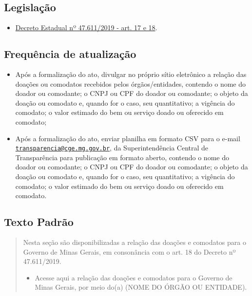 \documentclass[]{book}
\providecommand{\tightlist}{%
  \setlength{\itemsep}{0pt}\setlength{\parskip}{0pt}}
\begin{document}
\hypertarget{legislauxe7uxe3o-12}{%
\subsection{Legislação}\label{legislauxe7uxe3o-12}}

\begin{itemize}
\tightlist
\item
  \href{https://www.almg.gov.br/consulte/legislacao/completa/completa.html?tipo=DEC\&num=47611\&comp=\&ano=2019}{Decreto Estadual nº 47.611/2019 - art. 17 e 18}.
\end{itemize}

\hypertarget{frequuxeancia-de-atualizauxe7uxe3o-11}{%
\subsection{Frequência de atualização}\label{frequuxeancia-de-atualizauxe7uxe3o-11}}

\begin{itemize}
\tightlist
\item
  Após a formalização do ato, divulgar no próprio sítio eletrônico a relação das doações ou comodatos recebidos pelos órgãos/entidades, contendo o nome do doador ou comodante; o CNPJ ou CPF do doador ou comodante; o objeto da doação ou comodato e, quando for o caso, seu quantitativo; a vigência do comodato; o valor estimado do bem ou serviço doado ou oferecido em comodato;
\item
  Após a formalização do ato, enviar planilha em formato CSV para o e-mail \href{mailto:transparencia@cge.mg.gov.br}{\nolinkurl{transparencia@cge.mg.gov.br}}, da Superintendência Central de Transparência para publicação em formato aberto, contendo o nome do doador ou comodante; o CNPJ ou CPF do doador ou comodante; o objeto da doação ou comodato e, quando for o caso, seu quantitativo; a vigência do comodato; o valor estimado do bem ou serviço doado ou oferecido em comodato.
\end{itemize}

\hypertarget{texto-padruxe3o-12}{%
\subsection{Texto Padrão}\label{texto-padruxe3o-12}}

\begin{quote}
Nesta seção são disponibilizadas a relação das doações e comodatos para o Governo de Minas Gerais, em consonância com o art. 18 do Decreto nº 47.611/2019.

\begin{itemize}
\tightlist
\item
  Acesse aqui a relação das doações e comodatos para o Governo de Minas Gerais, por meio do(a) (NOME DO ÓRGÃO OU ENTIDADE).
\end{itemize}
\end{quote}
\end{document}
